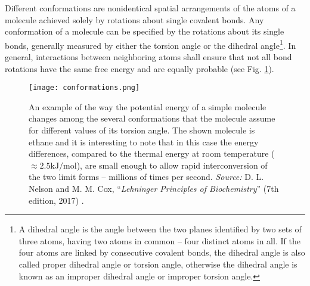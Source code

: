 Different conformations are nonidentical spatial arrangements of the atoms of a molecule achieved solely by rotations about single covalent bonds. %
Any conformation of a molecule %
can be specified by the rotations about its single bonds, generally measured by either the torsion angle or the dihedral angle\footnote{A dihedral angle is the angle between the two planes identified by two sets of three atoms, having two atoms in common -- four distinct atoms in all. If the four atoms are linked by consecutive covalent bonds, the dihedral angle is also called proper dihedral angle or torsion angle, otherwise the dihedral angle is known as an improper dihedral angle or improper torsion angle.}. In general, interactions between neighboring atoms shall ensure that not all bond rotations have the same free energy and are equally probable (see Fig. \ref{fig:EthaneConf}).


\begin{figure}[h]
\centering
\begin{minipage}[t]{0.85\textwidth}
\centering
\texttt{[image: conformations.png]}

\caption{\small{An example of the way the potential energy of a simple molecule changes among the several conformations that the molecule assume for different values of its torsion angle. The shown molecule is ethane and it is interesting to note that in this case the energy differences, compared to the thermal energy at room temperature ($\approx 2.5 \text{kJ}/\text{mol}$), are small enough to allow rapid interconversion of the two limit forms -- millions of times per second.
    \textit{Source:} D. L. Nelson and M. M. Cox, ``\textit{Lehninger Principles of Biochemistry}'' (7th edition, 2017) 
    \cite{nelson2017lehninger}.}
}

\label{fig:EthaneConf}
\end{minipage} 
\end{figure}



